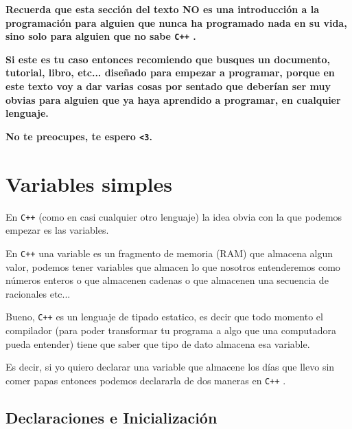 \documentclass[12pt, fleqn]{report}                             %
\theoremstyle{break}                                            %
\newcommand \Cpp  {\texttt{C++} }                               %
\begin{document}
        \textbf{
            Recuerda que esta sección del texto NO es una introducción a la programación para
            alguien que nunca ha programado nada en su vida, sino solo para alguien que
            no sabe \Cpp. 
        }

        \textbf{
            Si este es tu caso entonces recomiendo que busques un documento, tutorial, libro, etc...
            diseñado para empezar a programar, porque en este texto voy a dar varias cosas por sentado
            que deberían ser muy obvias para alguien que ya haya aprendido a programar, en cualquier
            lenguaje.
        }

        \textbf{
            No te preocupes, te espero \texttt{<3}.
        }

        \clearpage
        \section{Variables simples}

            En \Cpp (como en casi cualquier otro lenguaje) la idea obvia con la que podemos empezar
            es las variables.

            En \Cpp una variable es un fragmento de memoria (RAM) que almacena algun valor, 
            podemos tener variables que almacen lo que nosotros entenderemos como números enteros
            o que almacenen cadenas o que almacenen una secuencia de racionales etc...

            Bueno, \Cpp es un lenguaje de tipado estatico, es decir que todo momento el compilador
            (para poder transformar tu programa a algo que una computadora pueda entender) tiene
            que saber que tipo de dato almacena esa variable.

            Es decir, si yo quiero declarar una variable que almacene los días que llevo sin comer
            papas entonces podemos declararla de dos maneras en \Cpp.


            \subsection{Declaraciones e Inicialización}
\end{document}
